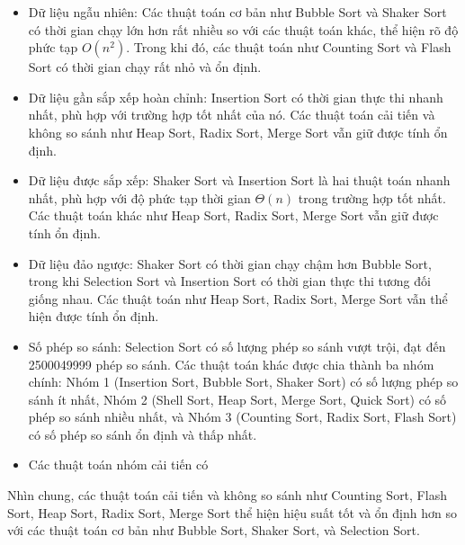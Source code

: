 \begin{itemize}
    \item Dữ liệu ngẫu nhiên: Các thuật toán cơ bản như Bubble Sort và Shaker Sort có thời gian chạy lớn hơn rất nhiều so với các thuật toán khác, thể hiện rõ độ phức tạp $O(n^2)$. Trong khi đó, các thuật toán như Counting Sort và Flash Sort có thời gian chạy rất nhỏ và ổn định.
    \item Dữ liệu gần sắp xếp hoàn chỉnh: Insertion Sort có thời gian thực thi nhanh nhất, phù hợp với trường hợp tốt nhất của nó. Các thuật toán cải tiến và không so sánh như Heap Sort, Radix Sort, Merge Sort vẫn giữ được tính ổn định.
    \item Dữ liệu được sắp xếp: Shaker Sort và Insertion Sort là hai thuật toán nhanh nhất, phù hợp với độ phức tạp thời gian $\Theta(n)$ trong trường hợp tốt nhất. Các thuật toán khác như Heap Sort, Radix Sort, Merge Sort vẫn giữ được tính ổn định.
    \item Dữ liệu đảo ngược: Shaker Sort có thời gian chạy chậm hơn Bubble Sort, trong khi Selection Sort và Insertion Sort có thời gian thực thi tương đối giống nhau. Các thuật toán như Heap Sort, Radix Sort, Merge Sort vẫn thể hiện được tính ổn định.
    \item Số phép so sánh: Selection Sort có số lượng phép so sánh vượt trội, đạt đến 2500049999 phép so sánh. Các thuật toán khác được chia thành ba nhóm chính: Nhóm 1 (Insertion Sort, Bubble Sort, Shaker Sort) có số lượng phép so sánh ít nhất, Nhóm 2 (Shell Sort, Heap Sort, Merge Sort, Quick Sort) có số phép so sánh nhiều nhất, và Nhóm 3 (Counting Sort, Radix Sort, Flash Sort) có số phép so sánh ổn định và thấp nhất.
    \item Các thuật toán nhóm cải tiến có 
\end{itemize}

Nhìn chung, các thuật toán cải tiến và không so sánh như Counting Sort, Flash Sort, Heap Sort, Radix Sort, Merge Sort thể hiện hiệu suất tốt và ổn định hơn so với các thuật toán cơ bản như Bubble Sort, Shaker Sort, và Selection Sort.